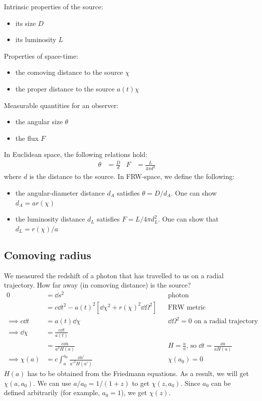 Intrinsic properties of the source:
\begin{itemize}
	\item its size $D$
	\item its luminosity $L$
\end{itemize}
Properties of space-time:
\begin{itemize}
	\item the comoving distance to the source $\chi$
	\item the proper distance to the source $a(t) \chi$
\end{itemize}
Measurable quantities for an observer:
\begin{itemize}
	\item the angular size $\theta$
	\item the flux $F$
\end{itemize}
In Euclidean space, the following relations hold:
\begin{align*}
	\theta &= \frac{D}{d}
	& F &= \frac{L}{4 \pi d^2}
\end{align*}
where $d$ is the distance to the source. In FRW-space, we define the following:
\begin{itemize}
	\item the angular-diameter distance $d_A$ satisfies $\theta = D/d_A$. One can show $d_A = a r(\chi)$
	\item the luminosity distance $d_L$ satisfies $F = L/4\pi d_L^2$. One can show that $d_L = r(\chi)/a$
\end{itemize}

\subsection{Comoving radius}
We measured the redshift of a photon that has travelled to us on a radial trajectory. How far away (in comoving distance) is the source?
\begin{align*}
	0 &= \dd{s}^2 &&\text{photon}\\
	&= c \dd{t}^2 - a(t)^2 [\dd{\chi}^2 + r(\chi)^2 \dd{\Omega}^2] &&\text{FRW metric}\\
	\implies c \dd{t} &= a(t) \dd{\chi} &&\dd{\Omega}^2 = 0 \text{ on a radial trajectory}\\
	\implies \dd{\chi} &= \frac{c \dd{t}}{a(t)}\\
	&= \frac{c \dd{a}}{a^2 H(a)} && H = \frac{\dot{a}}{a} \text{, so } \dd{t} = \frac{\dd{a}}{a H(a)}\\
	\implies \chi(a) &= c \int_a^{a_0} \frac{\dd{a'}}{a'^2 H(a')} && \chi(a_0) = 0
\end{align*}
$H(a)$ has to be obtained from the Friedmann equations. As a result, we will get $\chi(a,a_0)$. We can use $a/a_0 = 1/(1+z)$ to get $\chi(z,a_0)$. Since $a_0$ can be defined arbitrarily (for example, $a_0=1$), we get $\chi(z)$.

